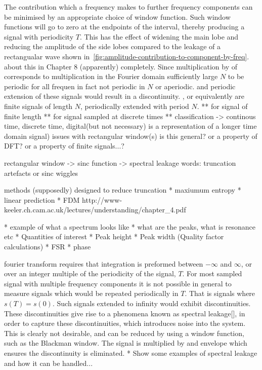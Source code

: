 The contribution which a frequency makes to further frequency components can be
minimised by an appropriate choice of window function. Such window functions
will go to zero at the endpoints of the interval, thereby producing a signal
with periodicity $T$. This has the effect of widening the main lobe and reducing
the amplitude of the side lobes compared to the leakage of a rectangualar wave
shown in~\ref{fig:amplitude-contribution-to-component-by-freq}. %
about this in Chapter 8 (apparently) %
completely. %
Since multiplication by of corresponds to multiplication in the Fourier domain
sufficiently large $N$ to be periodic for all frequen in fact not periodic in
$N$ or aperiodic. and periodic extension of these signals would result in a
discontinuity. , or equivalently are finite signals of length $N$, periodically
extended with period $N$. ** for signal of finite length ** for signal sampled
at discrete times ** classification -> continous time, discrete time,
digital(but not necessary) %
is a representation of a longer time domain signal) issues with rectangular
window(s) is this general? or a property of DFT? or a property of finite
signals...?

rectangular window -> sinc function -> spectral leakage words: truncation
artefacts or sinc wiggles

methods (supposedly) designed to reduce truncation * maxiumum entropy * linear
prediction * FDM %
http://www-keeler.ch.cam.ac.uk/lectures/understanding/chapter_4.pdf


* example of what a spectrum looks like * what are the peaks, what is resonance
etc * Quantities of interest * Peak height * Peak width (Quality factor
calculations) * FSR * phase

fourier transform requires that integration is preformed between $-\infty$ and
$\infty$, or over an integer multiple of the periodicity of the signal, $T$. For
most sampled signal with multiple frequency components it is not possible in
general to measure signals which would be repeated periodically in $T$. That is
signals where $s(T) = s(0)$. Such signals extended to infinity would exhibit
discontinuities. These discontinuities give rise to a phenomena known as
spectral leakage[], in order to capture these discontinuities, which introduces
noise into the system. This is clearly not desirable, and can be reduced by
using a window function, such as the Blackman window. The signal is multiplied
by and envelope which ensures the discontinuity is eliminated. * Show some
examples of spectral leakage and how it can be handled...
